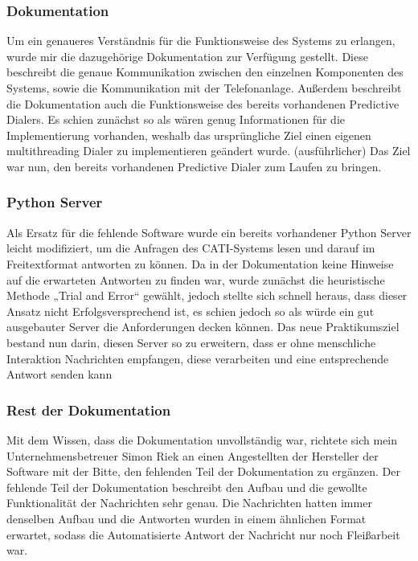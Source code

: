 \subsubsection{Dokumentation}

Um ein genaueres Verständnis für die Funktionsweise des Systems zu erlangen, wurde mir die dazugehörige Dokumentation zur Verfügung gestellt. Diese beschreibt die genaue Kommunikation zwischen den einzelnen Komponenten des Systems, sowie die Kommunikation mit der Telefonanlage. Außerdem beschreibt die Dokumentation auch die Funktionsweise des bereits vorhandenen Predictive Dialers. Es schien zunächst so als wären genug Informationen für die Implementierung vorhanden, weshalb das ursprüngliche Ziel einen eigenen multithreading Dialer zu implementieren geändert wurde. (ausführlicher) Das Ziel war nun, den bereits vorhandenen Predictive Dialer zum Laufen zu bringen.

\subsubsection{Python Server}

Als Ersatz für die fehlende Software wurde ein bereits vorhandener Python Server leicht modifiziert, um die Anfragen des CATI-Systems lesen und darauf im Freitextformat antworten zu können. Da in der Dokumentation keine Hinweise auf die erwarteten Antworten zu finden war, wurde zunächst die heuristische Methode „Trial and Error“ gewählt, jedoch stellte sich schnell heraus, dass dieser Ansatz nicht Erfolgsversprechend ist, es schien jedoch so als würde ein gut ausgebauter Server die Anforderungen decken können. Das neue Praktikumsziel bestand nun darin, diesen Server so zu erweitern, dass er ohne menschliche Interaktion Nachrichten empfangen, diese verarbeiten und eine entsprechende Antwort senden kann

\subsubsection{Rest der Dokumentation}
Mit dem Wissen, dass die Dokumentation unvollständig war, richtete sich mein Unternehmensbetreuer Simon Riek an einen Angestellten der Hersteller der Software mit der Bitte, den fehlenden Teil der Dokumentation zu ergänzen. Der fehlende Teil der Dokumentation beschreibt den Aufbau und die gewollte Funktionalität der Nachrichten sehr genau. Die Nachrichten hatten immer denselben Aufbau und die Antworten wurden in einem ähnlichen Format erwartet, sodass die Automatisierte Antwort der Nachricht nur noch Fleißarbeit war.